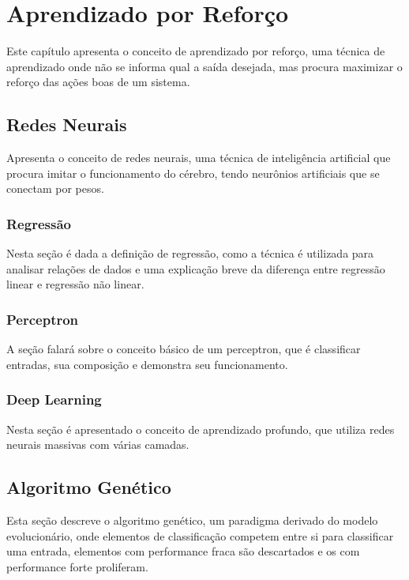 \chapter{Aprendizado por Reforço}
\label{chap:reinf}

 Este capítulo apresenta o conceito de aprendizado por reforço, uma técnica de aprendizado onde não se informa qual a saída desejada, mas procura maximizar o reforço das ações boas de um sistema.
 
\section{Redes Neurais}
\label{sec:neural}

Apresenta o conceito de redes neurais, uma técnica de inteligência artificial que procura imitar o funcionamento do cérebro, tendo neurônios artificiais que se conectam por pesos.

\subsection{Regressão}
\label{subsec:regression}

Nesta seção é dada a definição de regressão, como a técnica é utilizada para analisar relações de dados e uma explicação breve da diferença entre regressão linear e regressão não linear.

\subsection{Perceptron}
\label{subsec:perceptron}

A seção falará sobre o conceito básico de um perceptron, que é classificar entradas, sua composição e demonstra seu funcionamento.

\subsection{Deep Learning}
\label{subsec:deep}

Nesta seção é apresentado o conceito de aprendizado profundo, que utiliza redes neurais massivas com várias camadas.

\section{Algoritmo Genético}
\label{sec:genetic}

Esta seção descreve o algoritmo genético, um paradigma derivado do modelo evolucionário, onde elementos de classificação competem entre si para classificar uma entrada, elementos com performance fraca são descartados e os com performance forte proliferam.


